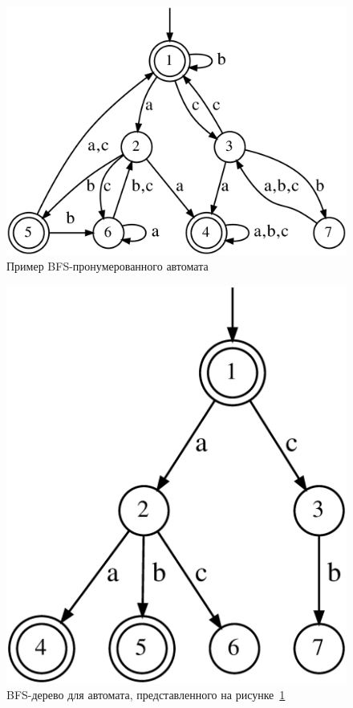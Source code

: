 \begin{figure}[ht]
  \centering
  \includegraphics[scale=0.15]{img/datamod/BFS-example.eps}
  \caption{Пример BFS-пронумерованного автомата}
  \label{img:bfs-ex}
\end{figure}

\begin{figure}[ht]
  \centering
  \includegraphics[scale=0.15]{img/datamod/BFS-tree.eps}
  \caption{BFS-дерево для автомата, представленного на рисунке~\ref{img:bfs-ex}}
  \label{img:bfs-tree-ex}
\end{figure}

